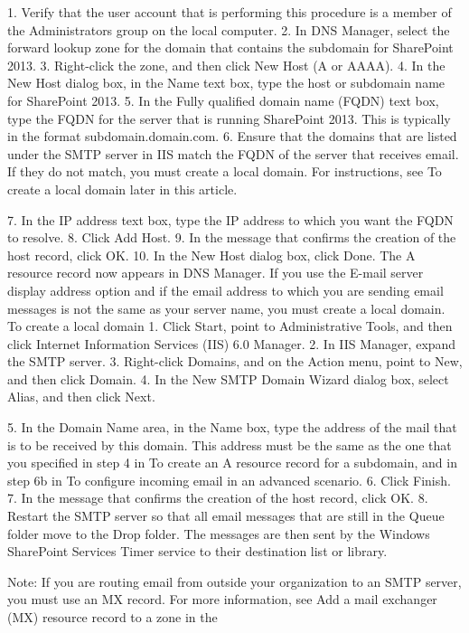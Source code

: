 1.	Verify that the user account that is performing this procedure is a member of the Administrators group on the local computer.
2.	In DNS Manager, select the forward lookup zone for the domain that contains the subdomain for SharePoint 2013.
3.	Right-click the zone, and then click New Host (A or AAAA).
4.	In the New Host dialog box, in the Name text box, type the host or subdomain name for SharePoint 2013.
5.	In the Fully qualified domain name (FQDN) text box, type the FQDN for the server that is running SharePoint 2013. This is typically in the format subdomain.domain.com.
6.	Ensure that the domains that are listed under the SMTP server in IIS match the FQDN of the server that receives email. If they do not match, you must create a local domain. For instructions, see To create a local domain later in this article.

7.	In the IP address text box, type the IP address to which you want the FQDN to resolve.
8.	Click Add Host.
9.	In the message that confirms the creation of the host record, click OK.
10.	In the New Host dialog box, click Done.
The A resource record now appears in DNS Manager.
If you use the E-mail server display address option and if the email address to which you are sending email messages is not the same as your server name, you must create a local domain.
To create a local domain
1.	Click Start, point to Administrative Tools, and then click Internet Information Services (IIS) 6.0 Manager.
2.	In IIS Manager, expand the SMTP server.
3.	Right-click Domains, and on the Action menu, point to New, and then click Domain.
4.	In the New SMTP Domain Wizard dialog box, select Alias, and then click Next.

5.	In the Domain Name area, in the Name box, type the address of the mail that is to be received by this domain.
This address must be the same as the one that you specified in step 4 in To create an A resource record for a subdomain, and in step 6b in To configure incoming email in an advanced scenario.
6.	Click Finish.
7.	In the message that confirms the creation of the host record, click OK.
8.	Restart the SMTP server so that all email messages that are still in the Queue folder move to the Drop folder. The messages are then sent by the Windows SharePoint Services Timer service to their destination list or library.

 	Note:
If you are routing email from outside your organization to an SMTP server, you must use an MX record. For more information, see Add a mail exchanger (MX) resource record to a zone in the
